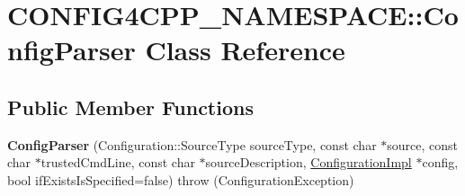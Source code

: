 \hypertarget{classCONFIG4CPP__NAMESPACE_1_1ConfigParser}{\section{C\-O\-N\-F\-I\-G4\-C\-P\-P\-\_\-\-N\-A\-M\-E\-S\-P\-A\-C\-E\-:\-:Config\-Parser Class Reference}
\label{classCONFIG4CPP__NAMESPACE_1_1ConfigParser}
}
\subsection*{Public Member Functions}
\begin{DoxyCompactItemize}
\item 
\hypertarget{classCONFIG4CPP__NAMESPACE_1_1ConfigParser_a81b932edd6cd656d40f70cd9509777e2}{{\bfseries Config\-Parser} (Configuration\-::\-Source\-Type source\-Type, const char $\ast$source, const char $\ast$trusted\-Cmd\-Line, const char $\ast$source\-Description, \hyperlink{classCONFIG4CPP__NAMESPACE_1_1ConfigurationImpl}{Configuration\-Impl} $\ast$config, bool if\-Exists\-Is\-Specified=false)  throw (\-Configuration\-Exception)}\label{classCONFIG4CPP__NAMESPACE_1_1ConfigParser_a81b932edd6cd656d40f70cd9509777e2}

\end{DoxyCompactItemize}
